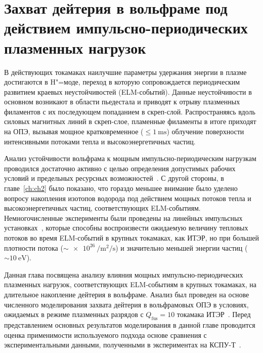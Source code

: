 \chapter{Захват дейтерия в вольфраме под действием импульсно-периодических плазменных нагрузок}\label{ch:ch3}

В действующих токамаках наилучшие параметры удержания энергии в плазме достигаются в H"=моде, переход в которую сопровождается периодическим развитием краевых неустойчивостей (ELM-событий). Данные неустойчивости в основном возникают в области пьедестала и приводят к отрыву плазменных филаментов с их последующем попаданием в скреп-слой. Распространяясь вдоль силовых магнитных линий в скреп-слое, пламенные филаменты в итоге приходят на ОПЭ, вызывая мощное кратковременное (\( \leq \SI{1}{\milli\second} \)) облучение поверхности интенсивными потоками тепла и высокоэнергетичных частиц.

Анализ устойчивости вольфрама к мощным импульсно-периодическим нагрузкам проводился достаточно активно с целью определения допустимых рабочих условий и предельных ресурсных возможностей~\cite{Pintsuk2012,Budaev2015,Rieth2019}. С другой стороны, в главе~\cref{ch:ch2} было показано, что гораздо меньшее внимание было уделено вопросу накопления изотопов водорода под действием мощных потоков тепла и высокоэнергетичных частиц, соответствующих ELM-событиям. Немногочисленные эксперименты были проведены на линейных импульсных установках~\cite{Poskakalov2020,Ogorodnikova,Nishijima2011}, которые способны воспроизвести ожидаемую величину тепловых потоков во время ELM-событий в крупных токамаках, как ИТЭР, но при большей плотности потока (\(\sim\SI{e26}{\per\meter\squared\per\second}\)) и значительно меньшей энергии частиц (\(\sim\SI{10}{\electronvolt}\)). 

Данная глава посвящена анализу влияния мощных импульсно-периодических плазменных нагрузок, соответствующих ELM-событиям в крупных токамаках, на длительное накопление дейтерия в вольфраме. Анализ был проведен на основе численного моделирования захвата дейтерия в вольфрамовых ОПЭ в условиях, ожидаемых в режиме плазменных разрядов с \(Q_\mathrm{fus}=\num{10}\) токамака ИТЭР~\cite{Kulagin2025_JNM}. Перед представлением основных результатов моделирования в данной главе проводится оценка применимости используемого подхода основе сравнения с экспериментальными данными, полученными в экспериментах на КСПУ-Т~\cite{Poskakalov2020}. 


